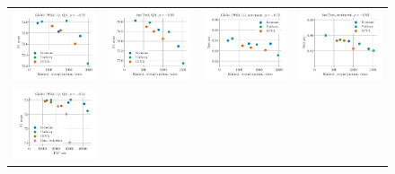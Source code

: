 \begin{figure}
	\centering
	\begin{tabular}{@{\hskip -0.0in}c@{\hskip -0.0in}c@{\hskip -0.0in}c@{\hskip -0.0in}c@{\hskip -0.0in}}
		\includegraphics[width=.245\linewidth]{figures/glove400k_qa_best-f1_vs_embed-frob-error_linx_stoc_ave-pt.pdf} &
		\includegraphics[width=.245\linewidth]{figures/fasttext1m_qa_best-f1_vs_embed-frob-error_linx_stoc_ave-pt.pdf} &
		\includegraphics[width=.245\linewidth]{figures/glove400k_sentiment_sst_test-acc_vs_embed-frob-error_linx_stoc_ave-pt.pdf} &
		\includegraphics[width=.245\linewidth]{figures/fasttext1m_sentiment_sst_test-acc_vs_embed-frob-error_linx_stoc_ave-pt.pdf} \\
		\includegraphics[width=.245\linewidth]{figures/glove400k_qa_best-f1_vs_gram-large-dim-frob-error_linx_stoc_ave-pt.pdf} &

\end{tabular}
\end{figure}
